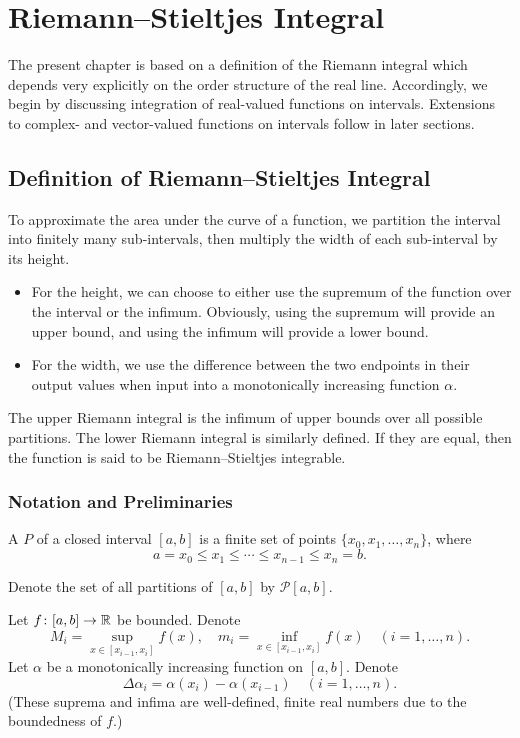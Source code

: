 \chapter{Riemann--Stieltjes Integral}\label{chap:rs-integration}
The present chapter is based on a definition of the Riemann integral which depends very explicitly on the order structure of the real line. 
Accordingly, we begin by discussing integration of real-valued functions on intervals. 
Extensions to complex- and vector-valued functions on intervals follow in later sections.
\section{Definition of Riemann--Stieltjes Integral}
To approximate the area under the curve of a function, we partition the interval into finitely many sub-intervals, then multiply the width of each sub-interval by its height.
\begin{itemize}
\item For the height, we can choose to either use the supremum of the function over the interval or the infimum. Obviously, using the supremum will provide an upper bound, and using the infimum will provide a lower bound.
\item For the width, we use the difference between the two endpoints in their output values when input into a monotonically increasing function $\alpha$.
\end{itemize}

The upper Riemann integral is the infimum of upper bounds over all possible partitions. The lower Riemann integral is similarly defined. If they are equal, then the function is said to be Riemann--Stieltjes integrable.

\subsection{Notation and Preliminaries}
A  $P$ of a closed interval $[a,b]$ is a finite set of points $\{x_0,x_1,\dots,x_n\}$, where
\[a=x_0\le x_1\le\cdots\le x_{n-1}\le x_n=b.\]

\begin{notation}
Denote the set of all partitions of $[a,b]$ by $\mathcal{P}[a,b]$.
\end{notation}

Let $f\colon[a,b]\to\mathbb R$ be bounded. Denote
\[M_i=\sup_{x\in[x_{i-1},x_i]}f(x),\quad m_i=\inf_{x\in[x_{i-1},x_i]}f(x)\quad(i=1,\dots,n).\]
Let $\alpha$ be a monotonically increasing function on $[a,b]$. Denote
\[\Delta\alpha_i=\alpha(x_i)-\alpha(x_{i-1})\quad(i=1,\dots,n).\]
(These suprema and infima are well-defined, finite real numbers due to the boundedness of $f$.)

